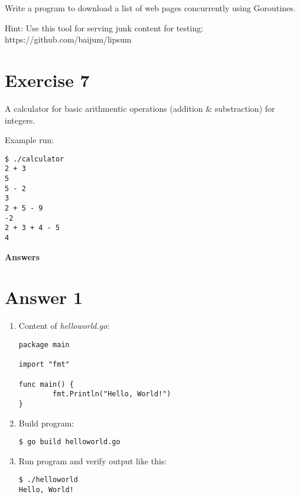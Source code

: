\documentclass[11pt,a4paper]{article}
\begin{document}
Write a program to download a list of web pages concurrently using
Goroutines.

Hint: Use this tool for serving junk content for testing:
https://github.com/baijum/lipsum

\section*{Exercise 7}

A calculator for basic arithmentic operations (addition \&
substraction) for integers.

Example run:

\begin{verbatim}
$ ./calculator
2 + 3
5
5 - 2
3
2 + 5 - 9
-2
2 + 3 + 4 - 5
4
\end{verbatim}

\newpage

\centerline{\LARGE\bf Answers}
\section*{Answer 1}

\begin{enumerate}
\item Content of {\it helloworld.go}:
\begin{verbatim}
package main

import "fmt"

func main() {
        fmt.Println("Hello, World!")
}
\end{verbatim}

\item Build program:
\begin{verbatim}
$ go build helloworld.go
\end{verbatim}

\item Run program and verify output like this:
\begin{verbatim}
$ ./helloworld
Hello, World!
\end{verbatim}
\end{enumerate}
\end{document}

